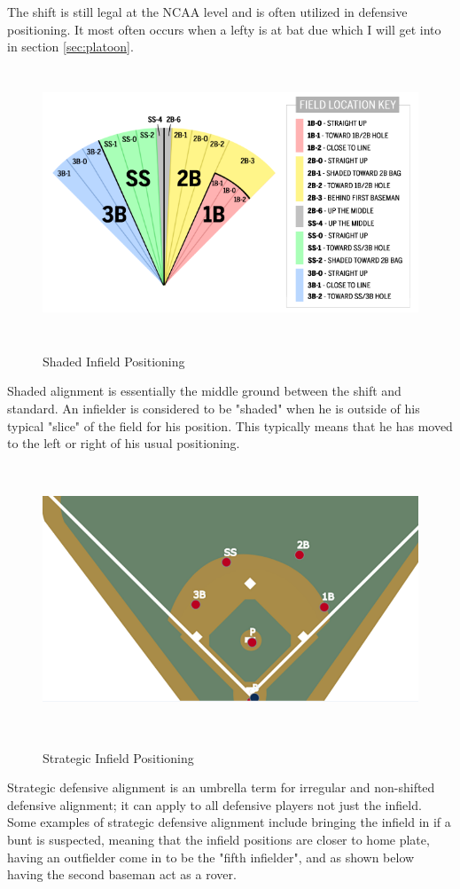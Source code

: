 \documentclass{article}
\begin{document}
The shift is still legal at the NCAA level and is often utilized in defensive positioning. It most often occurs when a lefty is at bat due which I will get into in section \ref{sec:platoon}. 


\newpage
\vspace{1.5cm}
\begin{figure}[h]
    \centering        
    \includegraphics[height=8cm]{images/shaded.png}
    \caption{Shaded Infield Positioning}
    \cite{mlb2023shifts}
\end{figure}
\vspace{1.5cm}
Shaded alignment is essentially the middle ground between the shift and standard. \cite{mlb2023shifts} An infielder is considered to be "shaded" when he is outside of his typical "slice" of the field for his position. This typically means that he has moved to the left or right of his usual positioning. 


\newpage

\vspace{1.5cm}
\begin{figure}[h]
    \centering        
    \includegraphics[height=8cm]{images/strategic.png}
    \caption{Strategic Infield Positioning}
    \cite{mlb2023shifts}
\end{figure}
\vspace{1.5cm}
Strategic defensive alignment is an umbrella term for irregular and non-shifted defensive alignment; it can apply to all defensive players not just the infield. Some examples of strategic defensive alignment include bringing the infield in if a bunt is suspected, meaning that the infield positions are closer to home plate, having an outfielder come in to be the "fifth infielder", and as shown below having the second baseman act as a rover. \cite{mlb2023shifts}
\end{document}

